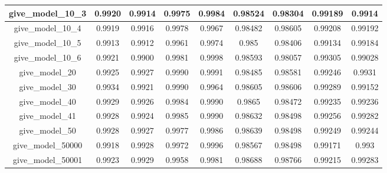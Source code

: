 \begin{table}[!h]
\begin{tabular} {|c|c|c|c|c|c|c|c|c| }
        give\_model\_10\_3                & 0.9920                        & 0.9914                         & 0.9975                      & 0.9984                  & 0.98524 & 0.98304 & 0.99189 & 0.9914  \\ \hline
        give\_model\_10\_4                & 0.9919                        & 0.9916                         & 0.9978                      & 0.9967                  & 0.98482 & 0.98605 & 0.99208 & 0.99192 \\ \hline
        give\_model\_10\_5                & 0.9913                        & 0.9912                         & 0.9961                      & 0.9974                  & 0.985   & 0.98406 & 0.99134 & 0.99184 \\ \hline
        give\_model\_10\_6                & 0.9921                        & 0.9900                         & 0.9981                      & 0.9998                  & 0.98593 & 0.98057 & 0.99305 & 0.99028 \\ \hline
        give\_model\_20                   & 0.9925                        & 0.9927                         & 0.9990                      & 0.9991                  & 0.98485 & 0.98581 & 0.99246 & 0.9931  \\ \hline
        give\_model\_30                   & 0.9934                        & 0.9921                         & 0.9990                      & 0.9964                  & 0.98605 & 0.98606 & 0.99289 & 0.99152 \\ \hline
        give\_model\_40                   & 0.9929                        & 0.9926                         & 0.9984                      & 0.9990                  & 0.9865  & 0.98472 & 0.99235 & 0.99236 \\ \hline
        give\_model\_41                   & 0.9928                        & 0.9924                         & 0.9985                      & 0.9990                  & 0.98632 & 0.98498 & 0.99256 & 0.99282 \\ \hline
        give\_model\_50                   & 0.9928                        & 0.9927                         & 0.9977                      & 0.9986                  & 0.98639 & 0.98498 & 0.99249 & 0.99244 \\ \hline
        give\_model\_50000                & 0.9918                        & 0.9928                         & 0.9972                      & 0.9996                  & 0.98567 & 0.98498 & 0.99171 & 0.993   \\ \hline
        give\_model\_50001                & 0.9923                        & 0.9929                         & 0.9958                      & 0.9981                  & 0.98688 & 0.98766 & 0.99215 & 0.99283 \\ \hline

\end{tabular}
\end{table}
